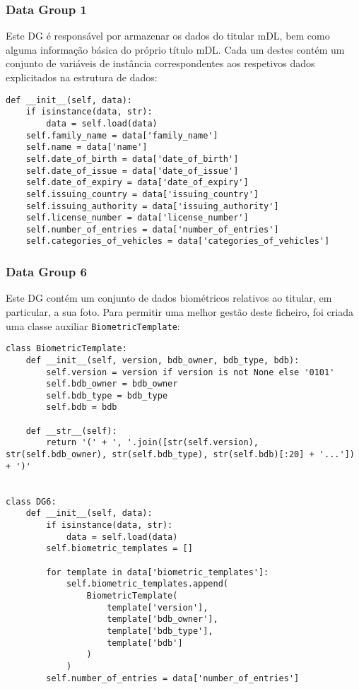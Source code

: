 \subsubsection{Data Group 1}

Este DG é responsável por armazenar os dados do titular mDL, bem como alguma informação básica do próprio título mDL. Cada um destes contém um conjunto de variáveis de instância correspondentes aos respetivos dados explicitados na estrutura de dados:

\begin{verbatim}
def __init__(self, data):
    if isinstance(data, str):
        data = self.load(data)
    self.family_name = data['family_name']
    self.name = data['name']
    self.date_of_birth = data['date_of_birth']
    self.date_of_issue = data['date_of_issue']
    self.date_of_expiry = data['date_of_expiry']
    self.issuing_country = data['issuing_country']
    self.issuing_authority = data['issuing_authority']
    self.license_number = data['license_number']
    self.number_of_entries = data['number_of_entries']
    self.categories_of_vehicles = data['categories_of_vehicles']
\end{verbatim}

\subsubsection{Data Group 6}

Este DG contém um conjunto de dados biométricos relativos ao titular, em particular, a sua foto. Para permitir uma melhor gestão deste ficheiro, foi criada uma classe auxiliar \texttt{BiometricTemplate}:

\begin{verbatim}
class BiometricTemplate:
    def __init__(self, version, bdb_owner, bdb_type, bdb):
        self.version = version if version is not None else '0101'
        self.bdb_owner = bdb_owner
        self.bdb_type = bdb_type
        self.bdb = bdb
    
    def __str__(self):
        return '(' + ', '.join([str(self.version), str(self.bdb_owner), str(self.bdb_type), str(self.bdb)[:20] + '...']) + ')'


class DG6:
    def __init__(self, data):
        if isinstance(data, str):
            data = self.load(data)
        self.biometric_templates = []
        
        for template in data['biometric_templates']:
            self.biometric_templates.append(
                BiometricTemplate(
                    template['version'],
                    template['bdb_owner'],
                    template['bdb_type'],
                    template['bdb']
                )
            )
        self.number_of_entries = data['number_of_entries']
\end{verbatim}

